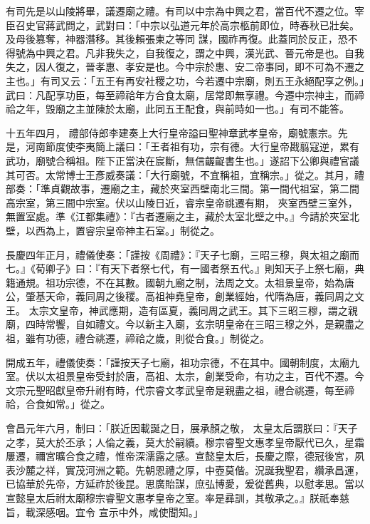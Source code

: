 \begin{pinyinscope}
 有司先是以山陵將畢，議遷廟之禮。有司以中宗為中興之君，當百代不遷之位。宰臣召史官蔣武問之，武對曰：「中宗以弘道元年於高宗柩前即位，時春秋已壯矣。及母後篡奪，神器潛移。其後賴張柬之等同
 謀，國祚再復。此蓋同於反正，恐不得號為中興之君。凡非我失之，自我復之，謂之中興，漢光武、晉元帝是也。自我失之，因人復之，晉孝惠、孝安是也。今中宗於惠、安二帝事同，即不可為不遷之主也。」有司又云：「五王有再安社稷之功，今若遷中宗廟，則五王永絕配享之例。」武曰：凡配享功臣，每至禘祫年方合食太廟，居常即無享禮。今遷中宗神主，而禘祫之年，毀廟之主並陳於太廟，此同五王配食，與前時如一也。」有司不能答。



 十五年四月，
 禮部侍郎李建奏上大行皇帝謚曰聖神章武孝皇帝，廟號憲宗。先是，河南節度使李夷簡上議曰：「王者祖有功，宗有德。大行皇帝戡翦寇逆，累有武功，廟號合稱祖。陛下正當決在宸斷，無信齷齪書生也。」遂詔下公卿與禮官議其可否。太常博士王彥威奏議：「大行廟號，不宜稱祖，宜稱宗。」從之。其月，禮部奏：「準貞觀故事，遷廟之主，藏於夾室西壁南北三間。第一間代祖室，第二間高宗室，第三間中宗室。伏以山陵日近，睿宗皇帝祧遷有期，
 夾室西壁三室外，無置室處。準《江都集禮》：『古者遷廟之主，藏於太室北壁之中。』今請於夾室北壁，以西為上，置睿宗皇帝神主石室。」制從之。



 長慶四年正月，禮儀使奏：「謹按《周禮》：『天子七廟，三昭三穆，與太祖之廟而七。』《荀卿子》曰：『有天下者祭七代，有一國者祭五代。』則知天子上祭七廟，典籍通規。祖功宗德，不在其數。國朝九廟之制，法周之文。太祖景皇帝，始為唐公，肇基天命，義同周之後稷。高祖神堯皇帝，創業經始，代隋為唐，義同周之文王。
 太宗文皇帝，神武應期，造有區夏，義同周之武王。其下三昭三穆，謂之親廟，四時常饗，自如禮文。今以新主入廟，玄宗明皇帝在三昭三穆之外，是親盡之祖，雖有功德，禮合祧遷，禘祫之歲，則從合食。」制從之。



 開成五年，禮儀使奏：「謹按天子七廟，祖功宗德，不在其中。國朝制度，太廟九室。伏以太祖景皇帝受封於唐，高祖、太宗，創業受命，有功之主，百代不遷。今文宗元聖昭獻皇帝升祔有時，代宗睿文孝武皇帝是親盡之祖，禮合祧遷，每至禘祫，合食如常。」從之。



 會昌元年六月，制曰：「朕近因載誕之日，展承顏之敬，
 太皇太后謂朕曰：『天子之孝，莫大於丕承；人倫之義，莫大於嗣續。穆宗睿聖文惠孝皇帝厭代已久，星霜屢遷，禰宮曠合食之禮，惟帝深濡露之感。宣懿皇太后，長慶之際，德冠後宮，夙表沙麓之祥，實茂河洲之範。先朝恩禮之厚，中壺莫偕。況誕我聖君，纘承昌運，已協華於先帝，方延祚於後昆。思廣貽謀，庶弘博愛，爰從舊典，以慰孝思。當以宣懿皇太后祔太廟穆宗睿聖文惠孝皇帝之室。率是彞訓，其敬承之。』朕祇奉慈旨，載深感咽。宜令
 宣示中外，咸使聞知。」




\end{pinyinscope}
